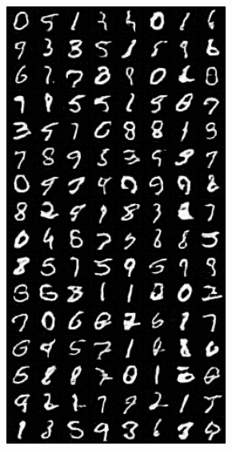 \begin{figure}[H]
    \centering

    \begin{subfigure}{0.2\textwidth}
        \centering
        \includegraphics[width=0.95\linewidth]{nz/nz10_fake_sample_epoch_0010.png}
        \caption{}
        \label{subfig:nz10}
    \end{subfigure}%

\end{figure}
